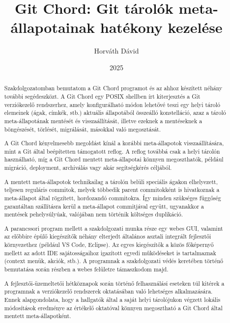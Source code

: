 \documentclass[
]{elteikthesis}[2025/03/25]
\title{Git Chord: Git tárolók meta-állapotainak hatékony kezelése}
\date{2025}
\author{Horváth Dávid}
\affiliation{egyetemi docens}
\begin{document}

\cleardoublepage

\maketitle
\cleardoublepage


\begin{abstract}
Szakdolgozatomban bemutatom a Git Chord programot és az ahhoz készített néhány további segédeszközt.
A Git Chord egy POSIX shellben írt kiterjesztés a Git
verziókezelő rendszerhez, amely konfigurálható módon lehetővé teszi egy helyi tároló elemeinek
(ágak, címkék, stb.)
aktuális állapotából összeálló konstelláció, azaz a tároló meta-állapotának mentését és visszaállítását,
illetve ezeknek a mentéseknek a böngészését, törlését, migrálását, másokkal való megosztását.

A Git Chord kényelmesebb megoldást kínál a korábbi meta-állapotok visszaállítására,
mint a Git által beépítetten támogatott reflog.
A reflog továbbá csak a helyi tárolón használható,
míg a Git Chord mentett meta-állapotai könnyen megoszthatók,
például migráció, deployment, archiválás vagy akár segítségkérés céljából.

A mentett meta-állapotok technikailag a tárolón belüli
speciális ágakon elhelyezett, teljesen reguláris commitok,
melyek többedik parent commitokként is hivatkoznak a meta-állapot által rögzített, hordozandó commitokra.
Így minden szükséges függőség garantáltan szállításra kerül a meta-állapot commitjával együtt,
ugyanakkor a mentések pehelysúlyúak, valójában nem történik költséges duplikáció.

A parancssori program mellett a szakdolgozati munka része egy webes GUI,
valamint az előbbire épülő kiegészítők néhány elterjedt
általános asztali integrált fejlesztői környezethez (például VS Code, Eclipse).
Az egyes kiegészítők a közös főképernyő mellett
az adott IDE sajátosságaihoz igazított egyedi működéseket is tartalmaznak (context menük, akciók, stb.).
A programnak a szakdolgozati védés keretében történő bemutatása során
részben a webes felületre támaszkodom majd.

A fejlesztői-üzemeltetői hétköznapok során történő felhasználási eseteken túl
kitérek a programnak a verziókezelő rendszerek oktatásában való lehetséges alkalmazására.
Ennek alapgondolata, hogy a hallgatók által
a saját helyi tárolójukon végzett lokális módosítások eredménye
az értékelő oktatóval könnyen megosztható a Git Chord által mentett meta-állapotként.
\end{abstract}
\end{document}

